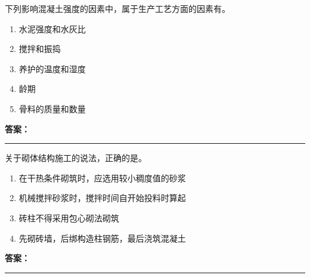 \documentclass[UTF8,fontset=fandol,11pt]{ctexart}
\newcommand{\answerline}{\textcolor{answerred}{\rule{2.4cm}{0.7pt}}}
\begin{document}
\begin{quizbox}[title={乱序第 139 题｜第四章混凝土结构工程}]

下列影响混凝土强度的因素中，属于生产工艺方面的因素有。\\

\begin{enumerate}[label=\Alph*.]

\item 水泥强度和水灰比

\item 搅拌和振捣

\item 养护的温度和湿度

\item 龄期

\item 骨料的质量和数量

\end{enumerate}

\textbf{\textcolor{answerred}{答案：}} \answerline

\end{quizbox}

\vspace{0.2em}

\begin{quizbox}[title={乱序第 140 题｜第六章砌筑工程}]

关于砌体结构施工的说法，正确的是。\\

\begin{enumerate}[label=\Alph*.]

\item 在干热条件砌筑时，应选用较小稠度值的砂浆

\item 机械搅拌砂浆时，搅拌时间自开始投料时算起

\item 砖柱不得采用包心砌法砌筑

\item 先砌砖墙，后绑构造柱钢筋，最后浇筑混凝土

\end{enumerate}

\textbf{\textcolor{answerred}{答案：}} \answerline

\end{quizbox}

\vspace{0.2em}
\end{document}
